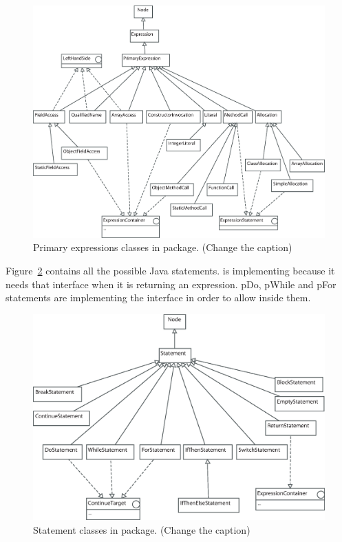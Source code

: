 \begin{figure}[!htb]
\begin{center}
\includegraphics[width=\textwidth]{images/primaryexpressions.eps}
\caption{Primary expressions classes in  package. (Change the caption)}
\label{fig:primary_expression_classes}
\end{center}
\end{figure}

Figure~\ref{fig:statement_classes} contains all the possible Java
statements.  is implementing
 because it needs that interface when it is
returning an expression. p{Do}, p{While} and p{For} statements are
implementing the  interface in order to allow
 inside them.


\begin{figure}[!htb]
\begin{center}
\includegraphics[width=\textwidth]{images/statements.eps}
\caption{Statement classes in  package. (Change the caption)}
\label{fig:statement_classes}
\end{center}
\end{figure}

